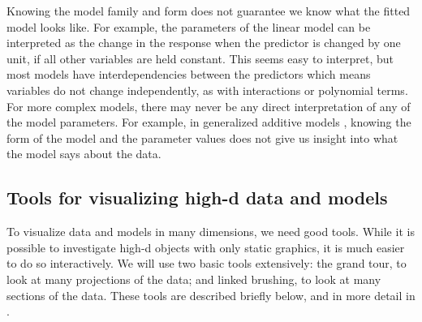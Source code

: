 \documentclass[preprint]{imsart}
\begin{document}
Knowing the model family and form does not guarantee we know what the fitted model looks like.  For example, the parameters of the linear model can be interpreted as the change in the response when the predictor is changed by one unit, if all other variables are held constant.  This seems easy to interpret, but most models have interdependencies between the predictors which means variables do not change independently, as with interactions or polynomial terms.  For more complex models, there may never be any direct interpretation of any of the model parameters.  For example, in generalized additive models \citep{wood:2006}, knowing the form of the model and the parameter values does not give us insight into what the model says about the data.

\subsection{Tools for visualizing high-d data and models}

To visualize data and models in many dimensions, we need good tools. While it is possible to investigate high-d objects with only static graphics, it is much easier to do so interactively. We will use two basic tools extensively: the grand tour, to look at many projections of the data; and linked brushing, to look at many sections of the data. These tools are described briefly below, and in more detail in \citet{cook:2007}. %
\end{document}
